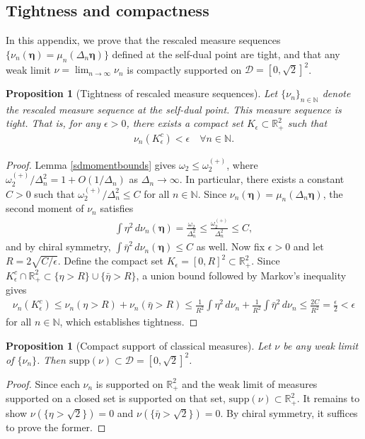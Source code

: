\documentclass[a4paper,11pt]{article}
\theoremstyle{plain}
\newtheorem{prop}[thm]{Proposition}
\theoremstyle{definition}
\theoremstyle{remark}
\newcommand{\bs}[1]{\boldsymbol{#1}}
\newcommand{\ba}{\begin{equation} \begin{aligned}}
\newcommand{\ea}{\end{aligned} \end{equation}}
\newcommand{\De}{\Delta}
\begin{document}
\begin{appendix}
\section{Tightness and compactness}
\label{tightness}

In this appendix, we prove that the rescaled measure sequences $\{\nu_n(\bs{\eta}) = \mu_n(\De_n \bs{\eta})\}$ defined at the self-dual point are tight, and that any weak limit $\nu = \lim_{n\to\infty} \nu_n$ is compactly supported on $\mathcal{D} = [0,\sqrt{2}]^2$.

\begin{prop}[Tightness of rescaled measure sequences]
\label{prop:tight}
Let $\{\nu_n\}_{n\in\mathbb{N}}$ denote the rescaled measure sequence at the self-dual point. This measure sequence is tight. That is, for any $\epsilon > 0$, there exists a compact set $K_\epsilon \subset \mathbb{R}_+^2$ such that
\ba
\nu_n(K_\epsilon^c) < \epsilon\quad \forall n \in \mathbb{N}.
\ea
\end{prop}
\begin{proof}
Lemma \ref{sdmomentbounds} gives $\omega_2 \leq \omega_2^{(+)}$, where $\omega_2^{(+)}/\De_n^2 = 1 + O(1/\De_n)$ as $\De_n \to \infty$. In particular, there exists a constant $C > 0$ such that $\omega_2^{(+)}/\De_n^2 \leq C$ for all $n\in\mathbb{N}$. Since $\nu_n(\bs{\eta}) = \mu_n(\De_n\bs{\eta})$, the second moment of $\nu_n$ satisfies
\ba
\int \eta^2\, d\nu_n(\bs{\eta}) = \frac{\omega_2}{\De_n^2} \leq \frac{\omega_2^{(+)}}{\De_n^2} \leq C,
\ea
and by chiral symmetry, $\int \bar{\eta}^2\, d\nu_n(\bs{\eta}) \leq C$ as well. Now fix $\epsilon > 0$ and let $R = 2\sqrt{C/\epsilon}$. Define the compact set $K_\epsilon = [0,R]^2 \subset \mathbb{R}^2_+$. Since $K_\epsilon^c \cap \mathbb{R}^2_+ \subset \{\eta > R\} \cup \{\bar{\eta} > R\}$, a union bound followed by Markov's inequality gives
\ba
\nu_n(K_\epsilon^c) \leq \nu_n(\eta > R) + \nu_n(\bar{\eta} > R) \leq \frac{1}{R^2}\int \eta^2\, d\nu_n + \frac{1}{R^2}\int \bar{\eta}^2\, d\nu_n \leq \frac{2C}{R^2} = \frac{\epsilon}{2} < \epsilon
\ea
for all $n \in \mathbb{N}$, which establishes tightness.
\end{proof}

\begin{prop}[Compact support of classical measures]
\label{prop:compactsupport}
Let $\nu$ be any weak limit of $\{\nu_n\}$. Then $\mathrm{supp}(\nu) \subset \mathcal{D} = [0,\sqrt{2}]^2$.
\end{prop}
\begin{proof}
Since each $\nu_n$ is supported on $\mathbb{R}^2_+$ and the weak limit of measures supported on a closed set is supported on that set, $\mathrm{supp}(\nu) \subset \mathbb{R}^2_+$. It remains to show $\nu(\{\eta > \sqrt{2}\}) = 0$ and $\nu(\{\bar{\eta} > \sqrt{2}\}) = 0$. By chiral symmetry, it suffices to prove the former.
 

\end{proof}
\end{appendix}
\end{document}
